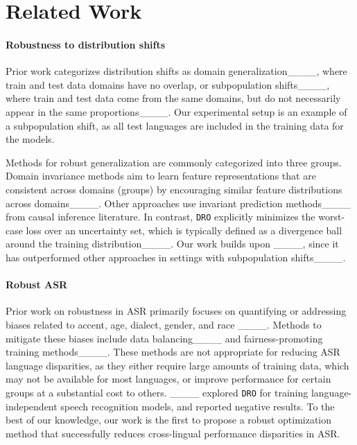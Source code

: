 \section{Related Work}
\paragraph{Robustness to distribution shifts}
Prior work categorizes distribution shifts as domain generalization____, where train and test data domains have no overlap, or subpopulation shifts____, where train and test data come from the same domains, but do not necessarily appear in the same proportions____. Our experimental setup is an example of a subpopulation shift, as all test languages are included in the training data for the models.

Methods for robust generalization are commonly categorized into three groups. Domain invariance methods aim to learn feature representations that are consistent across domains (groups) by encouraging similar feature distributions across domains____. Other approaches use invariant prediction methods____ from causal inference literature. In contrast, \texttt{DRO} explicitly minimizes the worst-case loss over an uncertainty set, which is typically defined as a divergence ball around the training distribution____. Our work builds upon \orig{}____, since it has outperformed other approaches in settings with subpopulation shifts____.

\paragraph{Robust ASR}
Prior work on robustness in ASR primarily focuses on quantifying or addressing biases related to accent, age, dialect, gender, and race ____.
Methods to mitigate these biases include data balancing____ and fairness-promoting training methods____.
These methods are not appropriate for reducing ASR language disparities, as they either require large amounts of training data, which may not be available for most languages, or improve performance for certain groups at a substantial cost to others.
____ explored \texttt{DRO} for training language-independent speech recognition models, and reported  negative results. To the best of our knowledge, our work is the first to propose a robust optimization method that successfully reduces cross-lingual performance disparities in ASR.
